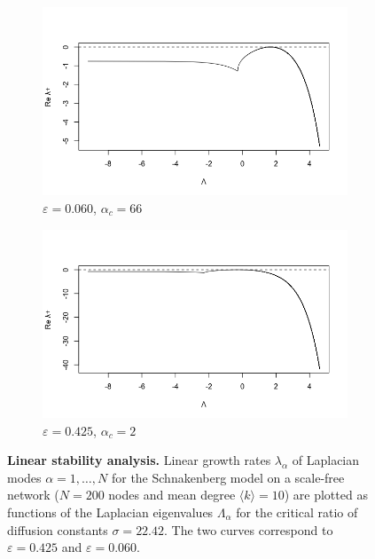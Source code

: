 \begin{figure}[!htbp] %
  \centering
  \begin{subfigure}{0.43\textwidth}
    \centering
    \includegraphics[width=\linewidth]{Graphs/Model2_growth-rate_vs_eigen66.png}
    \caption{\(\varepsilon=0.060\), \(\alpha_c=66\)}
  \end{subfigure}\hfill
  \begin{subfigure}{0.43\textwidth}
    \centering
    \includegraphics[width=\linewidth]{Graphs/Model2_growth-rate_vs_eigen2.png}
    \caption{\(\varepsilon=0.425\), \(\alpha_c=2\)}
  \end{subfigure}
  \caption{\textbf{Linear stability analysis.} Linear growth rates \(\lambda_\alpha\) of Laplacian modes \(\alpha=1,\ldots,N\)
  for the Schnakenberg model on a scale-free network (\(N=200\) nodes and mean degree \(\langle k\rangle=10\)) are plotted as functions of the Laplacian eigenvalues \(\Lambda_\alpha\) for the critical ratio of diffusion constants \(\sigma=22.42\). The two curves correspond to \(\varepsilon=0.425\) and \(\varepsilon=0.060\).}
  \label{fig:sch_critical_find}
\end{figure}

